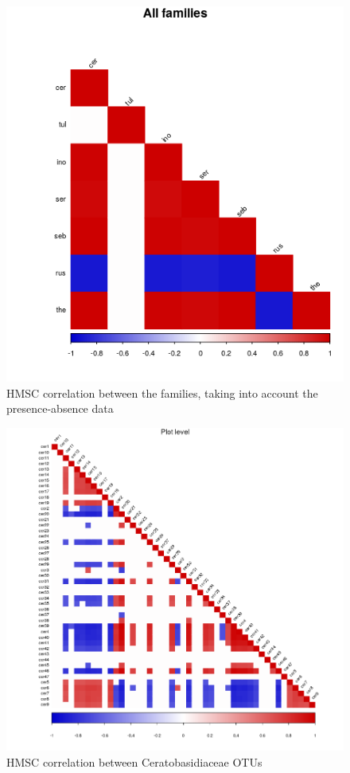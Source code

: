 \begin{figure}[htbp]
\centering
\includegraphics[keepaspectratio,width=\textwidth,height=0.75\textheight]{images/corrLump.png}
\caption{HMSC correlation between the families, taking into account the presence-absence data}
\end{figure}

\begin{figure}[htbp]
\centering
\includegraphics[keepaspectratio,width=\textwidth,height=0.75\textheight]{images/corrCer.png}
\caption{HMSC correlation between Ceratobasidiaceae OTUs}
\end{figure}

